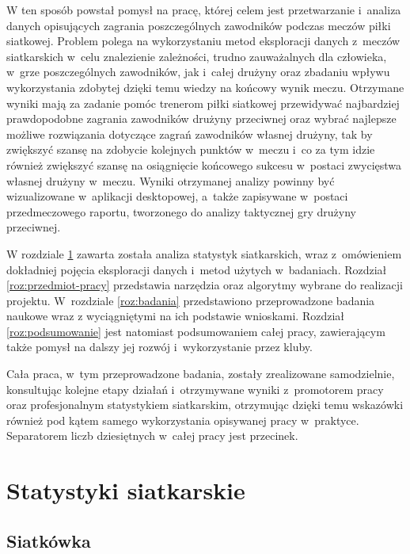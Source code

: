 \documentclass[a4paper,twoside,12pt]{book}
\begin{document}
W ten sposób powstał pomysł na pracę, której celem jest przetwarzanie i~analiza danych opisujących zagrania poszczególnych zawodników podczas meczów piłki siatkowej. Problem polega na wykorzystaniu metod eksploracji danych z~meczów siatkarskich w~celu znalezienie zależności, trudno zauważalnych dla człowieka, w~grze poszczególnych zawodników, jak i~całej drużyny oraz zbadaniu wpływu wykorzystania zdobytej dzięki temu wiedzy na końcowy wynik meczu. Otrzymane wyniki mają za zadanie pomóc trenerom piłki siatkowej przewidywać najbardziej prawdopodobne zagrania zawodników drużyny przeciwnej oraz wybrać najlepsze możliwe rozwiązania dotyczące zagrań zawodników własnej drużyny, tak by zwiększyć szansę na zdobycie kolejnych punktów w~meczu i~co za tym idzie również zwiększyć szansę na osiągnięcie końcowego sukcesu w~postaci zwycięstwa własnej drużyny w~meczu. Wyniki otrzymanej analizy powinny być wizualizowane w~aplikacji desktopowej, a~także zapisywane w~postaci przedmeczowego raportu, tworzonego do analizy taktycznej gry drużyny przeciwnej.

W rozdziale \ref{roz:analiza-tematu} zawarta została analiza statystyk siatkarskich, wraz z~omówieniem dokładniej pojęcia eksploracji danych i~metod użytych w~badaniach. Rozdział \ref{roz:przedmiot-pracy} przedstawia narzędzia oraz algorytmy wybrane do realizacji projektu. W~rozdziale \ref{roz:badania} przedstawiono przeprowadzone badania naukowe wraz z wyciągniętymi na ich podstawie wnioskami. Rozdział \ref{roz:podsumowanie} jest natomiast podsumowaniem całej pracy, zawierającym także pomysł na dalszy jej rozwój i~wykorzystanie przez kluby.

Cała praca, w~tym przeprowadzone badania, zostały zrealizowane samodzielnie, konsultując kolejne etapy działań i~otrzymywane wyniki z~promotorem pracy oraz profesjonalnym statystykiem siatkarskim, otrzymując dzięki temu wskazówki również pod kątem samego wykorzystania opisywanej pracy w~praktyce. Separatorem liczb dziesiętnych w~całej pracy jest przecinek.


\chapter{Statystyki siatkarskie}
\label{roz:analiza-tematu}

\section{Siatkówka}
\label{roz:siatkowka}
\end{document}
